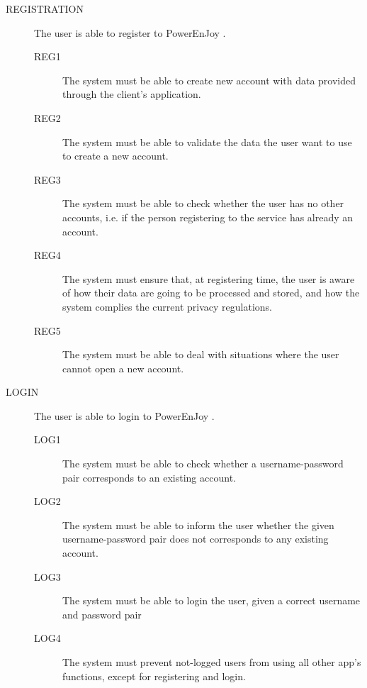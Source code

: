 \documentclass[11pt]{article} %
\newcommand{\pe}{PowerEnJoy }
\begin{document}
\begin{description}
	\item[REGISTRATION] The user is able to register to \pe.
	\begin{description}
	\item[REG1] The system must be able to create new account with data provided through the client's application.
	\item[REG2] The system must be able to validate the data the user want to use to create a new account.
	\item[REG3] The system must be able to check whether the user has no other accounts, i.e. if the person registering to the service has already an account.
	\item[REG4] The system must ensure that, at registering time, the user is aware of how their data are going to be processed and stored, and how the system complies the current privacy regulations.
	\item[REG5] The system must be able to deal with situations where the user cannot open a new account.
	\end{description}

	\item[LOGIN] The user is able to login to \pe.
	\begin{description}
	\item[LOG1] The system must be able to check whether a username-password pair corresponds to an existing account.
	\item[LOG2] The system must be able to inform the user whether the given username-password pair does not corresponds to any existing account.
	\item[LOG3] The system must be able to login the user, given a correct username and password pair
	\item[LOG4] The system must prevent not-logged users from using all other app's functions, except for registering and login.
	\end{description}


\end{description}
\end{document}
